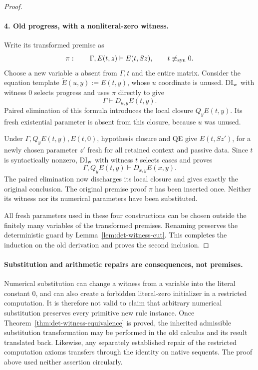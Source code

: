 \documentclass[11pt,letterpaper]{article}
\theoremstyle{definition}\newtheorem{definition}[theorem]{Definition}
\theoremstyle{remark}\newtheorem{remark}[theorem]{Remark}
\begin{document}
\begin{proof}
\paragraph{4. Old progress, with a nonliteral-zero witness.}
Write its transformed premise as
\[
 \pi:\qquad\Gamma,E(t,z)\vdash E(t,Sz),
 \qquad t\not\equiv_{\rm syn}0.
\]
Choose a new variable $u$ absent from $\Gamma,t$ and the entire matrix.
Consider the equation template $\widetilde E(u,y):=E(t,y)$, whose
$u$ coordinate is unused.  DI$_{\rm w}$ with witness $0$ selects
progress and uses $\pi$ directly to give
\[
                    \Gamma\vdash D_{u,y}E(t,y).
\]
Paired elimination of this formula introduces the local closure
$Q_yE(t,y)$.  Its fresh existential parameter is absent from this
closure, because $u$ was unused.

Under $\Gamma,Q_yE(t,y),E(t,0)$, hypothesis closure and QE give
$E(t,Sz')$, for a newly chosen parameter $z'$ fresh for all retained
context and passive data.  Since $t$ is syntactically nonzero,
DI$_{\rm w}$ with witness $t$ selects cases and proves
\[
          \Gamma,Q_yE(t,y)\vdash D_{x,y}E(x,y).
\]
The paired elimination now discharges its local closure and gives
exactly the original conclusion.  The original premise proof $\pi$
has been inserted once.  Neither its witness nor its numerical
parameters have been substituted.

All fresh parameters used in these four constructions can be chosen
outside the finitely many variables of the transformed premises.
Renaming preserves the deterministic guard by
Lemma~\ref{lem:det-witness-cut}.  This completes the induction on the
old derivation and proves the second inclusion.
\end{proof}

\paragraph{Substitution and arithmetic repairs are consequences, not
premises.}
Numerical substitution can change a witness from a variable into the
literal constant $0$, and can also create a forbidden literal-zero
initializer in a restricted computation.  It is therefore not valid to
claim that arbitrary numerical substitution preserves every primitive
new rule instance.  Once Theorem~\ref{thm:det-witness-equivalence} is
proved, the inherited admissible substitution transformation may be
performed in the old calculus and its result translated back.  Likewise,
any separately established repair of the restricted computation axioms
transfers through the identity on native sequents.  The proof above used
neither assertion circularly.
\end{document}
